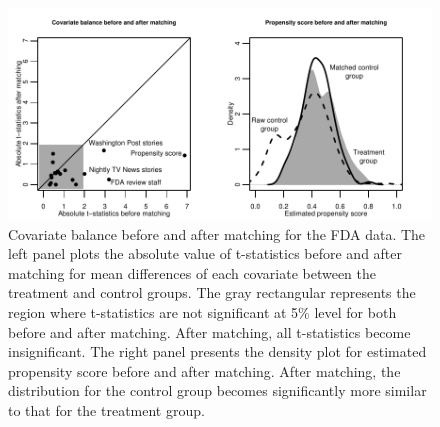 \documentclass[11pt,titlepage]{article}
\begin{document}
\begin{figure}[t] 
 \begin{center}
    \includegraphics{figs/fdabal.pdf}
  \end{center}
  \vspace{-0.275in}
  \caption{Covariate balance before and after matching for the FDA data.
    The left panel plots the absolute value of t-statistics before and
    after matching for mean differences of each covariate between the
    treatment and control groups. The gray rectangular represents the
    region where t-statistics are not significant at 5\% level for
    both before and after matching. After matching, all t-statistics
    become insignificant. The right panel presents the density plot
    for estimated propensity score before and after matching. After
    matching, the distribution for the control group becomes
    significantly more similar to that for the treatment group.  }
  \label{fg:fdabal}
\end{figure}
\end{document}
